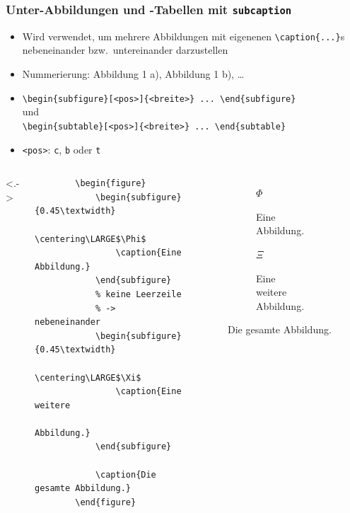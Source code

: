 \begin{frame}[<+->][fragile]
	\frametitle{Unter-Abbildungen und -Tabellen mit \texttt{subcaption}}
	\begin{itemize}
		\item Wird verwendet, um mehrere Abbildungen mit eigenenen \lstinline!\caption{...}!s nebeneinander bzw.\ untereinander darzustellen
		\item Nummerierung: Abbildung 1 a), Abbildung 1 b), …
		\item \lstinline!\begin{subfigure}[<pos>]{<breite>} ... \end{subfigure}!\\
		und\\
		\lstinline!\begin{subtable}[<pos>]{<breite>} ... \end{subtable}!
		\item \lstinline!<pos>!: \lstinline!c!, \lstinline!b! oder \lstinline!t!
	\end{itemize}
\end{frame}

\begin{frame}[<+->][fragile]
	\begin{columns}<.->
		\lstset{basicstyle=\footnotesize\ttfamily, frame=L, numbers=left, xleftmargin=0.5cm}
		\begin{lstlisting}
		\begin{figure}
		    \begin{subfigure}{0.45\textwidth}
		        \centering\LARGE$\Phi$
		        \caption{Eine Abbildung.}
		    \end{subfigure}
		    % keine Leerzeile
		    % -> nebeneinander
		    \begin{subfigure}{0.45\textwidth}
		        \centering\LARGE$\Xi$
		        \caption{Eine weitere
		            Abbildung.}
		    \end{subfigure}
		    
		    \caption{Die gesamte Abbildung.}
		\end{figure}
		\end{lstlisting}
		\begin{figure}
			\begin{subfigure}{0.45\textwidth}
				\centering\LARGE$\Phi$
				\caption{Eine Abbildung.}
		    \end{subfigure}
			\begin{subfigure}{0.45\textwidth}
				\centering\LARGE$\Xi$
				\caption{Eine weitere Abbildung.}
			\end{subfigure}

			\caption{Die gesamte Abbildung.}
		\end{figure}
	\end{columns}
	
	\bigskip
\end{frame}

